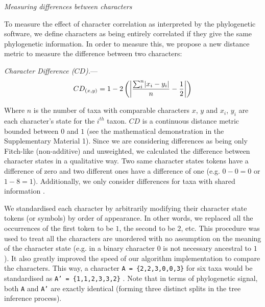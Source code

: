 \documentclass[12pt,letterpaper]{article}
\DeclarePairedDelimiter\abs{\lvert}{\rvert}%
\renewcommand{\subsection}[1]{%
\bigskip
\begin{center}
\begin{large}
\normalfont\itshape #1
\end{large}
\end{center}}
\renewcommand{\subsubsection}[1]{%
\vspace{2ex}
\noindent
\textit{#1.}---}
\begin{document}
\subsection{Measuring differences between characters}
\label{CD_description}
To measure the effect of character correlation as interpreted by the phylogenetic software, we define characters as being entirely correlated if they give the same phylogenetic information.
In order to measure this, we propose a new distance metric to measure the difference between two characters:

\subsubsection{Character Difference ($CD$)}
\begin{equation}
    CD_{(x,y)} = 1 - 2\left(\abs*{\frac{\sum_{i}^{n}\abs{x_{i} - y_{i}}}{n}-\frac{1}{2}}\right)
\end{equation}


\noindent Where $n$ is the number of taxa with comparable characters $x$, $y$ and $x_i$, $y_i$ are each character's state for the $i^{th}$ taxon.
$CD$ is a continuous distance metric bounded between $0$ and $1$ (see the mathematical demonstration in the Supplementary Material 1).
Since we are considering differences as being only Fitch-like (non-additive) and unweighted, we calculated the difference between character states in a qualitative way.
Two same character states tokens have a difference of zero and two different ones have a difference of one (e.g. $0 - 0 = 0$ or $1 - 8 = 1$).
Additionally, we only consider differences for taxa with shared information \citep[i.e. a Gower distance;][]{GowerDist}.

We standardised each character by arbitrarily modifying their character state tokens (or symbols) by order of appearance.
In other words, we replaced all the occurrences of the first token to be $1$, the second to be $2$, etc.
This procedure was used to treat all the characters are unordered with no assumption on the meaning of the character state (e.g. in a binary character $0$ is not necessary ancestral to $1$).
It also greatly improved the speed of our algorithm implementation to compare the characters.
This way, a character \texttt{A = \{2,2,3,0,0,3\}} for six taxa would be standardised as \texttt{A' = \{1,1,2,3,3,2\}} \citep[following the \textit{xyz} notation in][p.13]{felsenstein2004inferring}.
Note that in terms of phylogenetic signal, both \texttt{A} and \texttt{A'} are exactly identical (forming three distinct splits in the tree inference process).
\end{document}
